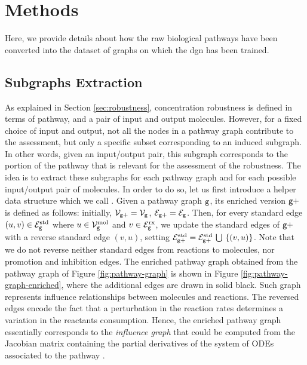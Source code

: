 \section{Methods}
Here, we provide details about how the raw biological pathways have been converted into the dataset of graphs on which the \gls{dgn} has been trained.

\subsection{Subgraphs Extraction}\label{sec:subgraphs-extraction}
As explained in Section \ref{sec:robustness}, concentration robustness is defined in terms of pathway, and a pair of input and output molecules. However, for a fixed choice of input and output, not all the nodes in a pathway graph contribute to the assessment, but only a specific subset corresponding to an induced subgraph. In other words, given an input/output pair, this subgraph corresponds to the portion of the pathway that is relevant for the assessment of the robustness. The idea is to extract these subgraphs for each pathway graph and for each possible input/output pair of molecules. In order to do so, let us first introduce a helper data structure which we call . Given a pathway graph $\mathtt{g}$, its enriched version $\mathtt{g+}$ is defined as follows: initially, $\Nodes_{\Graph{g+}}=\Nodes_{\Graph{g}}$, $\Edges_{\Graph{g+}}=\Edges_{\Graph{g}}$. Then, for every standard edge $(u, v) \in \Edges_{\Graph{g}}^{\Fun{std}}$ where $u \in \Nodes_{\Graph{g}}^{\Fun{mol}}$ and $v \in \Edges_{\Graph{g}}^{\Fun{rx}}$, we update the standard edges of $\mathtt{g+}$ with a reverse standard edge $(v,u)$, setting $\Edges_{\Graph{g+}}^{\Fun{std}} = \Edges_{\Graph{g+}}^{\Fun{std}} \Union \Set{(v, u)}$. Note that we do not reverse neither standard edges from reactions to molecules, nor promotion and inhibition edges. The enriched pathway graph obtained from the pathway graph of Figure \ref{fig:pathway-graph} is shown in Figure \ref{fig:pathway-graph-enriched}, where the additional edges are drawn in solid black. Such graph represents influence relationships between molecules and reactions. The reversed edges encode the fact that a perturbation in the reaction rates determines a variation in the reactants consumption. Hence, the enriched pathway graph essentially corresponds to the \emph{influence graph} that could be computed from the Jacobian matrix containing the partial derivatives of the system of ODEs associated to the pathway \citep{fages2008influencegraph}.
